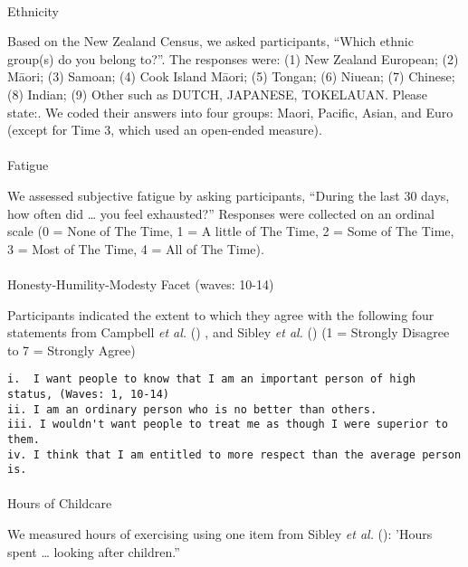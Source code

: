 \documentclass[
  single column]{article}
\makeatletter
\let\oldparagraph\paragraph
\renewcommand{\paragraph}{
    \@ifstar
      \xxxParagraphStar
      \xxxParagraphNoStar
  }
\newcommand{\xxxParagraphStar}[1]{\oldparagraph*{#1}\mbox{}}
\newcommand{\xxxParagraphNoStar}[1]{\oldparagraph{#1}\mbox{}}
\makeatother
\begin{document}
\paragraph{Ethnicity}\label{ethnicity}

Based on the New Zealand Census, we asked participants, ``Which ethnic
group(s) do you belong to?''. The responses were: (1) New Zealand
European; (2) Māori; (3) Samoan; (4) Cook Island Māori; (5) Tongan; (6)
Niuean; (7) Chinese; (8) Indian; (9) Other such as DUTCH, JAPANESE,
TOKELAUAN. Please state:. We coded their answers into four groups:
Maori, Pacific, Asian, and Euro (except for Time 3, which used an
open-ended measure).

\paragraph{Fatigue}\label{fatigue}

We assessed subjective fatigue by asking participants, ``During the last
30 days, how often did \ldots{} you feel exhausted?'' Responses were
collected on an ordinal scale (0 = None of The Time, 1 = A little of The
Time, 2 = Some of The Time, 3 = Most of The Time, 4 = All of The Time).

\paragraph{Honesty-Humility-Modesty Facet (waves:
10-14)}\label{honesty-humility-modesty-facet-waves-10-14}

Participants indicated the extent to which they agree with the following
four statements from Campbell \emph{et al.}
() , and Sibley \emph{et al.}
() (1 = Strongly Disagree to 7 = Strongly
Agree)

\begin{verbatim}
i.  I want people to know that I am an important person of high status, (Waves: 1, 10-14)
ii. I am an ordinary person who is no better than others.
iii. I wouldn't want people to treat me as though I were superior to them.
iv. I think that I am entitled to more respect than the average person is.
\end{verbatim}

\paragraph{Hours of Childcare}\label{hours-of-childcare}

We measured hours of exercising using one item from Sibley \emph{et al.}
(): 'Hours spent \ldots{} looking after
children.''
\end{document}
